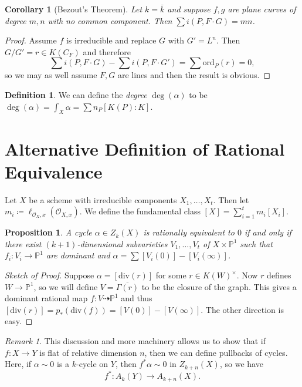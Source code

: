 \documentclass[leqno, openany]{memoir}
\newtheorem{cor}[thm]{Corollary}
\newtheorem{prop}[thm]{Proposition}
\theoremstyle{definition}
\newtheorem{defn}[thm]{Definition}
\theoremstyle{remark}
\newtheorem{rmk}[thm]{Remark}
\theoremstyle{plain}
\theoremstyle{definition}
\theoremstyle{remark}
\renewcommand{\P}{\mathbb{P}}
\newcommand{\mc}[1]{\mathcal{#1}}
\newcommand{\mr}[1]{\mathrm{#1}}
\newcommand{\ol}[1]{\overline{#1}}
\begin{document}
\begin{cor}[Bezout's Theorem]
    Let $k = \ol{k}$ and suppose $f,g$ are plane curves of degree $m,n$ with no common component. Then $\sum i(P, F \cdot G) = mn$.
\end{cor}

\begin{proof}
    Assume $f$ is irreducible and replace $G$ with $G' = L^n$. Then $G/G' = r \in K(C_F)$ and therefore
    \[ \sum i(P, F \cdot G) - \sum i(P, F \cdot G') = \sum \mr{ord}_P(r) = 0, \]
    so we may as well assume $F,G$ are lines and then the result is obvious.
\end{proof}

\begin{defn}
    We can define the \textit{degree} $\deg(\alpha)$ to be $\deg (\alpha) = \int_X \alpha = \sum n_P [K(P) : K]$.
\end{defn}

\section{Alternative Definition of Rational Equivalence}%
\label{sec:alternative_definition_of_rational_equivalence}

Let $X$ be a scheme with irreducible components $X_1, \ldots, X_t$. Then let $m_i \coloneqq \ell_{\mc{O}_X,x} (\mc{O}_{X,x})$. We define the fundamental class $[X] = \sum_{i=1}^t m_i [X_i]$.

\begin{prop}
    A cycle $\alpha \in Z_k(X)$ is rationally equivalent to $0$ if and only if there exist $(k+1)$-dimensional subvarieties $V_1, \ldots, V_t$ of $X \times \P^1$ such that $f_i \colon V_i \to \P^1$ are dominant and $\alpha = \sum [V_i(0)] - [V_i(\infty)]$.
\end{prop}

\begin{proof}[Sketch of Proof]
    Suppose $\alpha = [\mr{div}(r)]$ for some $r \in {K(W)}^{\times}$. Now $r$ defines $W \to \P^1$, so we will define $V = \ol{\Gamma(r)}$ to be the closure of the graph. This gives a dominant rational map $f \colon V \dashrightarrow \P^1$ and thus $[\mr{div}(r)] = p_*(\mr{div}(f)) = [V(0)] - [V(\infty)]$. The other direction is easy.
\end{proof}

\begin{rmk}
    This discussion and more machinery allows us to show that if $f \colon X \to Y$ is flat of relative dimension $n$, then we can define pullbacks of cycles. Here, if $\alpha \sim 0$ is a $k$-cycle on $Y$, then $f^* \alpha \sim 0$ in $Z_{k+n}(X)$, so we have
    \[ f^* \colon A_k (Y) \to A_{k+n}(X). \]
\end{rmk}
\end{document}
